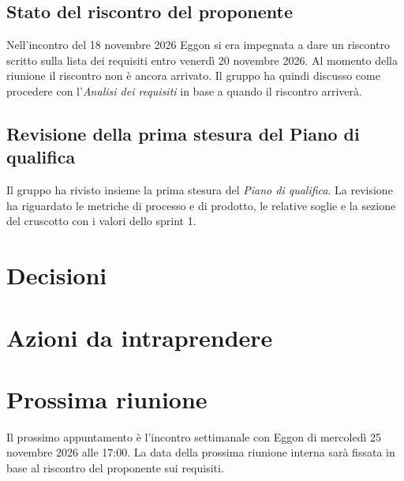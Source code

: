 \documentclass[interno]{gpt}
\begin{document}
\subsection{Stato del riscontro del proponente}
Nell'incontro del 18 novembre 2026 Eggon si era impegnata a dare un riscontro scritto sulla lista dei requisiti entro venerdì 20 novembre 2026.
Al momento della riunione il riscontro non è ancora arrivato.
Il gruppo ha quindi discusso come procedere con l'\textit{Analisi dei requisiti} in base a quando il riscontro arriverà.

\subsection{Revisione della prima stesura del Piano di qualifica}
Il gruppo ha rivisto insieme la prima stesura del \textit{Piano di qualifica}.
La revisione ha riguardato le metriche di processo e di prodotto, le relative soglie e la sezione del cruscotto con i valori dello sprint 1.

\section{Decisioni}
\begin{decisioni}
\end{decisioni}

\section{Azioni da intraprendere}
\begin{azioni}
\end{azioni}

\section{Prossima riunione}
Il prossimo appuntamento è l'incontro settimanale con Eggon di mercoledì 25 novembre 2026 alle 17:00.
La data della prossima riunione interna sarà fissata in base al riscontro del proponente sui requisiti.
\end{document}
